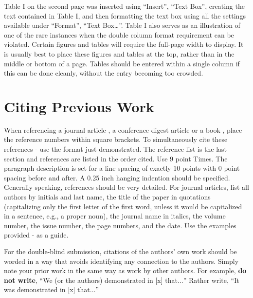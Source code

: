 \documentclass[conference]{IEEEtran}
\begin{document}
{Table I on the second page was inserted using ``Insert'', ``Text
Box'', creating the text contained in Table I, and then formatting the
text box using all the settings available under ``Format'', ``Text
Box\dots ''. Table I also serves as an illustration of one of the rare
instances when the double column format requirement can be
violated. Certain figures and tables will require the full-page width
to display. It is usually best to place these figures and tables at
the top, rather than in the middle or bottom of a page. Tables should be entered within a single column if this can be done cleanly, without the entry becoming too crowded.

\section{Citing Previous Work}
When referencing a journal article \cite{cantrell1}, a conference
digest article \cite{cantrell2} or a book \cite{krauss}, place the reference numbers within square
brackets. To simultaneously cite these references \cite{cantrell1} - \cite{krauss} use the format just demonstrated. The reference list is the last section and references are listed in the order cited. Use 9 point Times. The paragraph description is set for a line spacing of exactly 10 points with 0 point spacing before and after. A 0.25 inch hanging indention should be specified.
Generally speaking, references should be very detailed. For journal
articles, list all authors by initials and last name, the title of the
paper in quotations (capitalizing only the first letter of the first
word, unless it would be capitalized in a sentence, e.g., a proper
noun), the journal name in italics, the volume number, the issue
number, the page numbers, and the date. Use the examples provided
\cite{cantrell1} - \cite{krauss} as a guide.

For the double-blind submission, citations of the authors' own work should be worded in a way that avoids identifying any connection to the authors. Simply note your prior work in the same way as work by other authors. For example, {\bfseries do not write}, ``We (or the authors) demonstrated in [x] that$\ldots$'' Rather write, ``It was demonstrated in [x] that$\ldots$''

\vfil\eject

}
\end{document}
